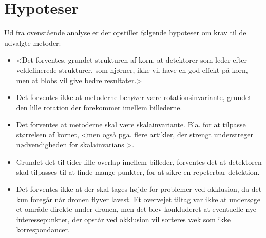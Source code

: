 \section{Hypoteser}
Ud fra ovenstående analyse er der opstillet følgende hypoteser om krav til de udvalgte metoder:
\begin{itemize}
\item{ <Det forventes, grundet strukturen af korn, at detektorer som leder efter veldefinerede strukturer, som hjørner, ikke vil have en god effekt på korn, men at blobs vil give bedre resultater.> }
\item{ Det forventes ikke at metoderne behøver være rotationsinvariante, grundet den lille rotation der forekommer imellem billederne. }
\item{Det forventes at metoderne skal være skalainvariante. Bla. for at tilpasse størrelsen af kornet, <men også pga. flere artikler, der strengt understreger nødvendigheden for skalainvarians \cite{koen} \cite{blob} \cite{lindenscale}>.}
\item{ Grundet det til tider lille overlap imellem billeder, forventes det at detektoren skal tilpasses til at finde mange punkter, for at sikre en repeterbar detektion.}
\item{Det forventes ikke at der skal tages højde for problemer ved okklusion, da det kun foregår når dronen flyver lavest. Et overvejet tiltag var ikke at undersøge et område direkte under dronen, men det blev konkluderet at eventuelle nye interessepunkter, der opstår ved okklusion vil sorteres væk som ikke korrespondancer.}
\end{itemize}
